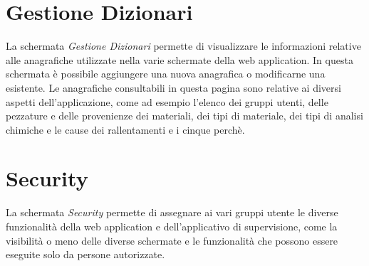   \section{Gestione Dizionari}
  La schermata \textit{Gestione Dizionari} permette di visualizzare le informazioni relative
  alle anagrafiche utilizzate nella varie schermate della web application. In questa schermata è possibile aggiungere una nuova
  anagrafica o modificarne una esistente. Le anagrafiche consultabili in questa pagina sono relative ai diversi aspetti
  dell'applicazione, come ad esempio l'elenco dei gruppi utenti, delle pezzature e delle provenienze dei materiali, dei
  tipi di materiale, dei tipi di analisi chimiche e le cause dei rallentamenti e i cinque perchè.
  
  \section{Security}
  La schermata \textit{Security} permette di assegnare ai vari gruppi utente
  le diverse funzionalità della web application e dell'applicativo di supervisione, come la visibilità o meno delle
  diverse schermate e le funzionalità che possono essere eseguite solo da persone autorizzate.